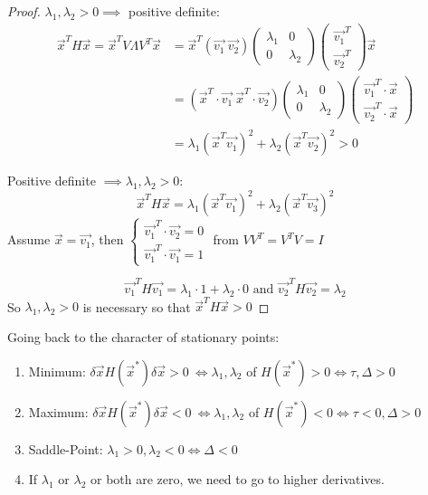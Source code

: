 \documentclass[10pt]{scrartcl}
\begin{document}
\begin{proof}
$\lambda_1,\lambda_2 > 0 \implies$ positive definite:
\[\begin{aligned}\vec{x}^TH\vec{x} = \vec{x}^TV\Lambda V^T\vec{x} 
&= \vec{x}^T(\vec{v_1}~\vec{v_2})\begin{pmatrix}
\lambda_1 & 0 \\ 0 & \lambda_2	
\end{pmatrix}
\begin{pmatrix}
\vec{v_1}^T\\ \vec{v_2}^T	
\end{pmatrix}\vec{x}\\
&= (\vec{x}^T\cdot\vec{v_1} ~\vec{x}^T\cdot\vec{v_2})
\begin{pmatrix}
\lambda_1 & 0 \\ 0 & \lambda_2	
\end{pmatrix}
\begin{pmatrix}
\vec{v_1}^T\cdot\vec{x}\\ \vec{v_2}^T\cdot\vec{x}	
\end{pmatrix}\\
&= \lambda_1(\vec{x}^T\vec{v_1})^2 + \lambda_2(\vec{x}^T\vec{v_2})^2 > 0
\end{aligned}
\]

Positive definite $\implies \lambda_1,\lambda_2 > 0$:
\[\vec{x}^TH\vec{x} = \lambda_1(\vec{x}^T\vec{v_1})^2 +\lambda_2(\vec{x}^T\vec{v_3})^2  \]
Assume $\vec{x} = \vec{v_1}$, then 
$\begin{cases}
 	\vec{v_1}^T\cdot\vec{v_2} = 0\\
    \vec{v_1}^T\cdot\vec{v_1} = 1
 \end{cases}
 $
from $VV^T = V^TV = I$

\[\vec{v_1}^TH\vec{v_1} = \lambda_1\cdot 1 + \lambda_2 \cdot 0 \text{ and } \vec{v_2}^TH\vec{v_2} = \lambda_2\]
So $\lambda_1,\lambda_2 >0$ is necessary so that $\vec{x}^TH\vec{x} > 0$
\end{proof}

Going back to the character of stationary points: \begin{enumerate}
 \item Minimum: $\delta \vec{x}H(\vec{x}^*)\delta \vec{x} > 0\ \iff \lambda_1,\lambda_2$ of $H(\vec{x}^*) > 0 \iff \tau, \Delta >0$
 \item Maximum: $\delta \vec{x}H(\vec{x}^*)\delta \vec{x} < 0\ \iff \lambda_1,\lambda_2$ of $H(\vec{x}^*) < 0 \iff \tau <0, \Delta >0$
 \item Saddle-Point: $\lambda_1 >0, \lambda_2 < 0 \iff \Delta < 0$
 \item If $\lambda_1$ or $\lambda_2$ or both are zero, we need to go to higher derivatives. 
 \end{enumerate}~
\end{document}
